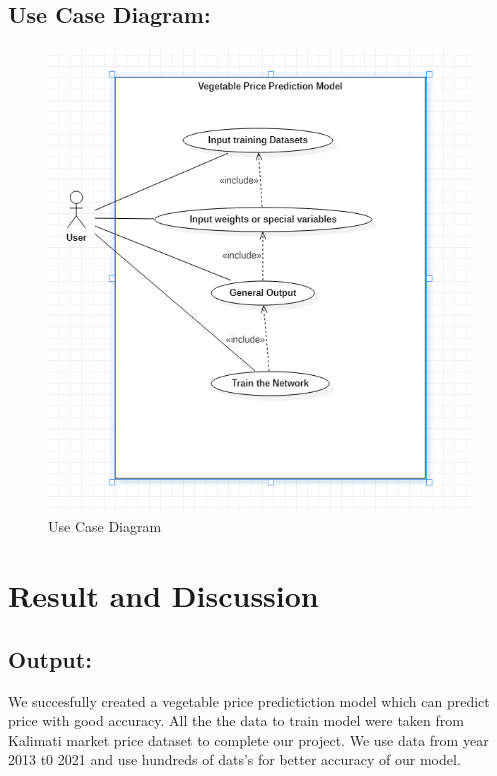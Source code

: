 \section{Use Case Diagram:}
\begin{figure}[H]
	\centering
	\includegraphics[width=160mm]{images/usecase.png}
	\caption{Use Case Diagram} %
	\label{figusecase} %
\end{figure}




\chapter{Result and Discussion}

\section{Output:}
We succesfully created a vegetable price predictiction model which can predict price with good accuracy. All the the data to train model were taken from Kalimati market price dataset to complete our project. We use 
data from year 2013 t0 2021 and use hundreds of dats's for better accuracy of our model. 

